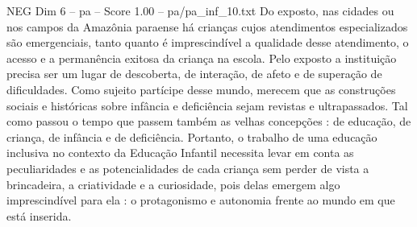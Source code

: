 \begin{textsample}{NEG Dim 6 – pa – Score 1.00 – pa/pa\_inf\_10.txt}
Do exposto, nas cidades ou nos campos da Amazônia paraense há crianças cujos atendimentos especializados são emergenciais, tanto quanto é imprescindível a qualidade desse atendimento, o acesso e a permanência exitosa da criança na escola.
Pelo exposto a instituição precisa ser um lugar de descoberta, de interação, de afeto e de superação de dificuldades.
Como sujeito partícipe desse mundo, merecem que as construções sociais e históricas sobre infância e deficiência sejam revistas e ultrapassados.
Tal como passou o tempo que passem também as velhas concepções : de educação, de criança, de infância e de deficiência.
Portanto, o trabalho de uma educação inclusiva no contexto da Educação Infantil necessita levar em conta as peculiaridades e as potencialidades de cada criança sem perder de vista a brincadeira, a criatividade e a curiosidade, pois delas emergem algo imprescindível para ela : o protagonismo e autonomia frente ao mundo em que está inserida.

\end{textsample}
